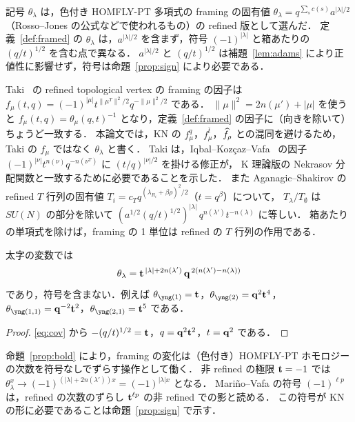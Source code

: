 \begin{remark}
記号 $\theta_\lambda$ は，色付き HOMFLY-PT 多項式の framing の固有値 $\theta_\lambda=q^{\sum_{s}c(s)}a^{|\lambda|/2}$（Rosso--Jones の公式などで使われるもの）の refined 版として選んだ．
定義~\ref{def:framed} の $\theta_\lambda$ は，$a^{|\lambda|/2}$ を含まず，符号 $(-1)^{|\lambda|}$ と箱あたりの $(q/t)^{1/2}$ を含む点で異なる．
$a^{|\lambda|/2}$ と $(q/t)^{1/2}$ は補題~\ref{lem:adams} により正値性に影響せず，符号は命題~\ref{prop:sign} により必要である．
\end{remark}

\begin{remark}\label{rem:Taki}
Taki~\cite{Taki07} の refined topological vertex の framing の因子は
$f_\mu(t,q)=(-1)^{|\mu|}t^{\|\mu^T\|^2/2}q^{-\|\mu\|^2/2}$ である．
$\|\mu\|^2=2n(\mu')+|\mu|$ を使うと $f_\mu(t,q)=\theta_\mu(q,t)^{-1}$ となり，定義~\ref{def:framed} の因子に（向きを除いて）ちょうど一致する．
本論文では，KN の $f^q_\mu$，$f^{\bar t}_\mu$，$\widehat f_\rho$ との混同を避けるため，Taki の $f_\mu$ ではなく $\theta_\lambda$ と書く．
Taki は，Iqbal--Kozçaz--Vafa~\cite{Iqbal07} の因子 $(-1)^{|\nu|}t^{n(\nu)}q^{-n(\nu^T)}$ に $(t/q)^{|\nu|/2}$ を掛ける修正が，
K 理論版の Nekrasov 分配関数と一致するために必要であることを示した．
また Aganagic--Shakirov の refined $T$ 行列の固有値 $T_i=c_Tq^{(\lambda_{R_i}+\beta\rho)^2/2}$（$t=q^\beta$）について，
$T_\lambda/T_\emptyset$ は $SU(N)$ の部分を除いて $(a^{1/2}(q/t)^{1/2})^{|\lambda|}\,q^{n(\lambda')}t^{-n(\lambda)}$ に等しい．
箱あたりの単項式を除けば，framing の 1 単位は refined の $T$ 行列の作用である．
\end{remark}

\begin{proposition}\label{prop:bold}
太字の変数では
\[
\theta_\lambda=\mathbf{t}^{\,|\lambda|+2n(\lambda')}\,\mathbf{q}^{\,2(n(\lambda')-n(\lambda))}
\]
であり，符号を含まない．例えば $\theta_{\yng(1)}=\bt$，$\theta_{\yng(2)}=\bq^2\bt^4$，$\theta_{\yng(1,1)}=\bq^{-2}\bt^2$，$\theta_{\yng(2,1)}=\bt^5$ である．
\end{proposition}
\begin{proof}
\eqref{eq:cov} から $-(q/t)^{1/2}=\mathbf{t}$，$q=\mathbf{q}^2\mathbf{t}^2$，$t=\mathbf{q}^2$ である．
\end{proof}

\begin{remark}
命題~\ref{prop:bold} により，framing の変化は（色付き）HOMFLY-PT ホモロジーの次数を符号なしでずらす操作として働く．
非 refined の極限 $\mathbf{t}=-1$ では $\theta_\lambda^x\to(-1)^{(|\lambda|+2n(\lambda'))x}=(-1)^{|\lambda|x}$ となる．
Mariño--Vafa の符号 $(-1)^{\ell p}$ は，refined の次数のずらし $\mathbf{t}^{\ell p}$ の非 refined での影と読める．
この符号が KN の形に必要であることは命題~\ref{prop:sign} で示す．
\end{remark}

